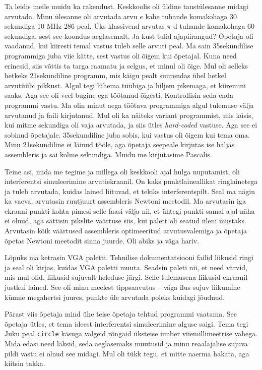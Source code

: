 Ta leidis meile muidu ka rakendust. Keskkoolis oli üldine taustülesanne midagi
arvutada. Minu ülesanne oli arvutada arvu $e$ kahe tuhande komakohaga 30
sekundiga 10 MHz 286 peal. Üks klassivend arvutas $\pi$-d tuhande komakohaga 60
sekundiga, sest see koondus aeglasemalt. Ja kust tulid ajapiirangud? Õpetaja
oli vaadanud, kui kiiresti temal vastus tuleb selle arvuti peal. Ma sain
35sekundilise programmiga juba viie kätte, sest vastus oli õigem kui õpetajal.
Kuna need erinesid, siis võttis ta targa raamatu ja selgus, et minul oli
õige. Mul oli selleks hetkeks 21sekundiline programm, mis käigu pealt
suurendas ühel hetkel arvutüübi pikkust. Algul tegi lühema tüübiga ja hiljem
pikemaga, et kiiremini saaks. Aga see oli veel bugine ega töötanud õigesti.
Kontrollisin seda enda programmi vastu. Ma olin minut aega töötava
programmiga algul tulemuse välja arvutanud ja faili kirjutanud. Mul oli
ka näiteks variant programmist, mis küsis, kui mitme sekundiga oli vaja
arvutada, ja siis ütles \emph{hard-coded} vastuse. Aga see ei sobinud õpetajale.
35sekundiline juba sobis, kui vastus oli õigem kui tema oma. Minu
21sekundiline ei läinud tööle, aga õpetaja seepeale kirjutas ise
haljas assembleris ja sai kolme sekundiga. Muidu
me kirjutasime Pascalis.

Teine asi, mida me tegime ja millega oli keskkooli ajal hulga nuputamist, oli
interferentsi simuleerimine arvutiekraanil. On kaks punktlaineallikat
ringlainetega ja tuleb arvutada, kuidas lained liituvad, et tekiks
interferentspilt. Seal ma nägin ka vaeva, arvutasin ruutjuurt
assembleris Newtoni meetodil. Ma arvutasin iga ekraani
punkti kohta pimesi selle faasi välja nii, et ühtegi punkti samal ajal näha ei
olnud, aga sättisin pikslite väärtuse siis, kui palett oli seatud üleni mustaks.
Arvutasin kõik väärtused assembleris optimeeritud arvutusvalemiga ja õpetaja
õpetas Newtoni meetodit sinna juurde. Oli abiks ja väga hariv.

Lõpuks ma ketrasin VGA paletti. Tehnilise dokumentatsiooni failid
liikusid ringi ja seal oli kirjas, kuidas VGA paletti muuta. Seadsin paleti
nii, et need värvid, mis mul olid, liikusid sujuvalt heleduse järgi. 
Selle tulemusena liikusid ekraanil justkui lained. See oli minu meelest
tippsaavutus -- väga ilus sujuv liikumine kümne megahertsi juures,
punkte üle arvutada poleks kuidagi jõudnud. 

Pärast viis õpetaja mind ühe teise
õpetaja tehtud programmi vaatama. See õpetaja ütles, et tema ideest interferentsi simuleerimine alguse saigi. Tema tegi Juku peal \verb|circle|
käsuga valgeid rõngaid üksteise ümber viiemillimeetrise vahega. Mida edasi need läksid,
seda aeglasemaks muutusid ja minu reaalajalise sujuva pildi vastu ei olnud
see midagi. Mul oli tükk tegu, et mitte naerma hakata, aga kiitsin takka.

